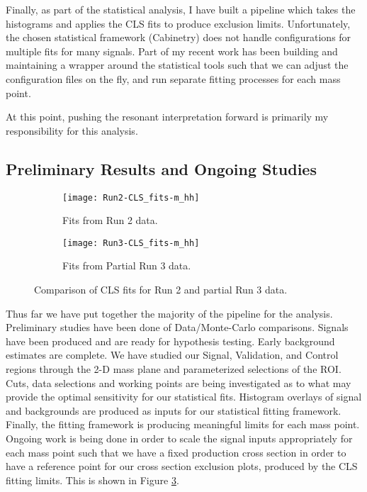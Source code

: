 \documentclass[12pt]{article}
\begin{document}
Finally, as part of the statistical analysis, I have built a pipeline which
takes the histograms and applies the CLS fits to produce exclusion limits.
Unfortunately, the chosen statistical framework (Cabinetry) \cite{cabinetry}
does not handle configurations for multiple fits for many signals. Part of my
recent work has been building and maintaining a wrapper around the statistical
tools such that we can adjust the configuration files on the fly, and run
separate fitting processes for each mass point.

At this point, pushing the resonant interpretation forward is primarily my
responsibility for this analysis.



\subsection{Preliminary Results and Ongoing Studies}
\begin{figure}[t]
    \centering
    \begin{subfigure}[t]{.48\textwidth}
        \centering
        \texttt{[image: Run2-CLS\_fits-m\_hh]}
        \caption{Fits from Run 2 data.}
        \label{subfig:cls-run2}
    \end{subfigure}
    \begin{subfigure}[t]{.48\textwidth}
        \centering
        \texttt{[image: Run3-CLS\_fits-m\_hh]}
        \caption{Fits from Partial Run 3 data.}
        \label{subfig:cls-run3}
    \end{subfigure}
\caption{Comparison of CLS fits for Run 2 and partial Run 3 data.}
\label{fig:cls_fit_results}
\end{figure}
Thus far we have put together the majority of the pipeline for the analysis.
Preliminary studies have been done of Data/Monte-Carlo comparisons. Signals have been
produced and are ready for hypothesis testing. Early background estimates are
complete. We have studied our Signal, Validation, and Control regions through
the 2-D mass plane and parameterized selections of the ROI. Cuts, data
selections and working points are being investigated as to what may provide the
optimal sensitivity for our statistical fits. Histogram overlays of signal and
backgrounds are produced as inputs for our statistical fitting framework.
Finally, the fitting framework is producing meaningful limits for each mass
point. Ongoing work is being done in order to scale the signal inputs
appropriately for each mass point such that we have a fixed production cross
section in order to have a reference point for our cross section exclusion
plots, produced by the CLS fitting limits. This is shown in Figure
\ref{fig:cls_fit_results}. 
\end{document}
